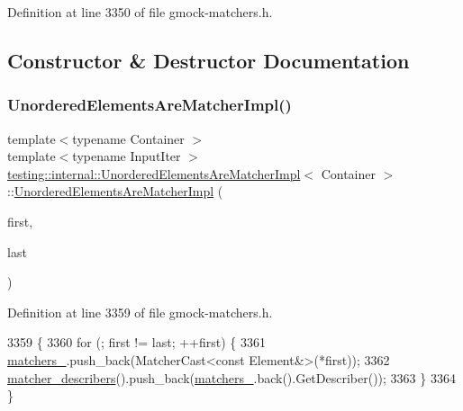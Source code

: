 Definition at line 3350 of file gmock-\/matchers.\+h.



\subsection{Constructor \& Destructor Documentation}
\mbox{\label{classtesting_1_1internal_1_1UnorderedElementsAreMatcherImpl_a0b0f40cf4de84f14020c3d4c9ba06c42}} 
\subsubsection{\texorpdfstring{Unordered\+Elements\+Are\+Matcher\+Impl()}{UnorderedElementsAreMatcherImpl()}}
{\footnotesize\ttfamily template$<$typename Container $>$ \\
template$<$typename Input\+Iter $>$ \\
\hyperlink{classtesting_1_1internal_1_1UnorderedElementsAreMatcherImpl}{testing\+::internal\+::\+Unordered\+Elements\+Are\+Matcher\+Impl}$<$ Container $>$\+::\hyperlink{classtesting_1_1internal_1_1UnorderedElementsAreMatcherImpl}{Unordered\+Elements\+Are\+Matcher\+Impl} (\begin{DoxyParamCaption}\item[{Input\+Iter}]{first,  }\item[{Input\+Iter}]{last }\end{DoxyParamCaption})\hspace{0.3cm}{\ttfamily [inline]}}



Definition at line 3359 of file gmock-\/matchers.\+h.


\begin{DoxyCode}
3359                                                                    \{
3360     \textcolor{keywordflow}{for} (; first != last; ++first) \{
3361       \hyperlink{classtesting_1_1internal_1_1UnorderedElementsAreMatcherImpl_a8f369b32578badf837a76ee66b033c81}{matchers\_}.push\_back(MatcherCast<const Element&>(*first));
3362       \hyperlink{classtesting_1_1internal_1_1UnorderedElementsAreMatcherImplBase_a04d4adc809d9c06331f8dbb67b879ac0}{matcher\_describers}().push\_back(\hyperlink{classtesting_1_1internal_1_1UnorderedElementsAreMatcherImpl_a8f369b32578badf837a76ee66b033c81}{matchers\_}.back().GetDescriber());
3363     \}
3364   \}
\end{DoxyCode}


